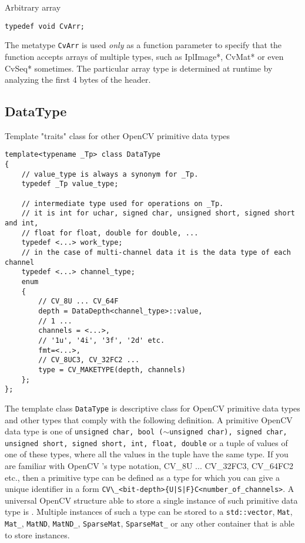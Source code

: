 \label{CvArr}
Arbitrary array

\begin{lstlisting}
typedef void CvArr;
\end{lstlisting}

The metatype \texttt{CvArr} is used \textit{only} as a function parameter to specify that the function accepts arrays of multiple types, such as IplImage*, CvMat* or even CvSeq* sometimes. The particular array type is determined at runtime by analyzing the first 4 bytes of the header.
\fi


\ifCpp
\subsection{DataType}\label{DataType}
Template "traits" class for other OpenCV primitive data types

\begin{lstlisting}
template<typename _Tp> class DataType
{
    // value_type is always a synonym for _Tp.
    typedef _Tp value_type;
    
    // intermediate type used for operations on _Tp.
    // it is int for uchar, signed char, unsigned short, signed short and int,
    // float for float, double for double, ...
    typedef <...> work_type;
    // in the case of multi-channel data it is the data type of each channel
    typedef <...> channel_type;
    enum
    {
        // CV_8U ... CV_64F
        depth = DataDepth<channel_type>::value,
        // 1 ... 
        channels = <...>,
        // '1u', '4i', '3f', '2d' etc.
        fmt=<...>,
        // CV_8UC3, CV_32FC2 ...
        type = CV_MAKETYPE(depth, channels)
    };
};
\end{lstlisting}

The template class \texttt{DataType} is descriptive class for OpenCV primitive data types and other types that comply with the following definition. A primitive OpenCV data type is one of \texttt{unsigned char, bool ($\sim$unsigned char), signed char, unsigned short, signed short, int, float, double} or a tuple of values of one of these types, where all the values in the tuple have the same type. If you are familiar with OpenCV 's type notation, CV\_8U ... CV\_32FC3, CV\_64FC2 etc., then a primitive type can be defined as a type for which you can give a unique identifier in a form \verb*"CV\_<bit-depth>{U|S|F}C<number_of_channels>". A universal OpenCV structure able to store a single instance of such primitive data type is . Multiple instances of such a type can be stored to a \texttt{std::vector}, \texttt{Mat}, \texttt{Mat\_}, \texttt{MatND}, \texttt{MatND\_}, \texttt{SparseMat}, \texttt{SparseMat\_} or any other container that is able to store  instances.
 
